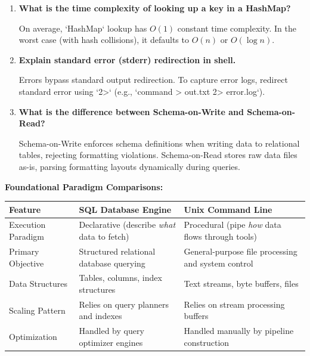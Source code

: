 \documentclass[12pt,a4paper]{article}
\newcommand{\Q}[1]{\textbf{#1}\par\noindent\ignorespaces}
\renewcommand{\arraystretch}{1.45}
\begin{document}
\begin{tcolorbox}[exambox, title={\textbf{Frequently Asked / Viva Questions}}]
\begin{enumerate}[leftmargin=*, topsep=0pt, label=\textbf{Q\arabic*.}, itemsep=5pt]
  \item \Q{What is the time complexity of looking up a key in a HashMap?}
        On average, `HashMap` lookup has $O(1)$ constant time complexity. In the worst case (with hash collisions), it defaults to $O(n)$ or $O(\log n)$.
        
  \item \Q{Explain standard error (stderr) redirection in shell.}
        Errors bypass standard output redirection. To capture error logs, redirect standard error using `2>` (e.g., `command > out.txt 2> error.log`).
        
  \item \Q{What is the difference between Schema-on-Write and Schema-on-Read?}
        Schema-on-Write enforces schema definitions when writing data to relational tables, rejecting formatting violations. Schema-on-Read stores raw data files as-is, parsing formatting layouts dynamically during queries.
\end{enumerate}
\end{tcolorbox}

\vspace{6pt}

\begin{tcolorbox}[tikzbox, title={\textbf{Comparison Snapshot}}]
\textbf{Foundational Paradigm Comparisons:}\par\vspace{6pt}\noindent
{\renewcommand{\arraystretch}{1.4}%
\begin{tabularx}{\linewidth}{|B{3.2cm}|Y|Y|}
\hline
\textbf{Feature} & \textbf{SQL Database Engine} & \textbf{Unix Command Line} \\
\hline
Execution Paradigm & Declarative (describe \textit{what} data to fetch) & Procedural (pipe \textit{how} data flows through tools) \\
\hline
Primary Objective & Structured relational database querying & General-purpose file processing and system control \\
\hline
Data Structures & Tables, columns, index structures & Text streams, byte buffers, files \\
\hline
Scaling Pattern & Relies on query planners and indexes & Relies on stream processing buffers \\
\hline
Optimization & Handled by query optimizer engines & Handled manually by pipeline construction \\
\hline
\end{tabularx}}
\end{tcolorbox}
\end{document}
